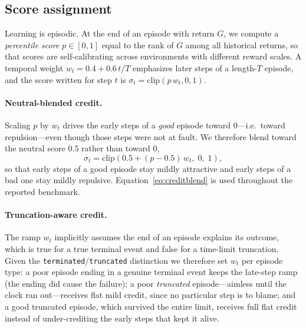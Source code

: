\documentclass[11pt]{article}
\begin{document}
\subsection{Score assignment}
Learning is episodic. At the end of an episode with return $G$, we compute a
\emph{percentile score} $p\in[0,1]$ equal to the rank of $G$ among all
historical returns, so that scores are self-calibrating across environments with
different reward scales. A temporal weight $w_t=0.4+0.6\,t/T$ emphasizes later
steps of a length-$T$ episode, and the score written for step $t$ is
$\sigma_t=\mathrm{clip}(p\,w_t,0,1)$.

\paragraph{Neutral-blended credit.} Scaling $p$ by $w_t$ drives the early steps
of a \emph{good} episode toward $0$---i.e.\ toward repulsion---even though those
steps were not at fault. We therefore blend toward the neutral score $0.5$
rather than toward $0$,
\begin{equation}
\sigma_t=\mathrm{clip}\!\left(0.5+(p-0.5)\,w_t,\;0,\;1\right),
\label{eq:creditblend}
\end{equation}
so that early steps of a good episode stay mildly attractive and early steps of
a bad one stay mildly repulsive. Equation~\eqref{eq:creditblend} is used
throughout the reported benchmark.

\paragraph{Truncation-aware credit.} The ramp $w_t$ implicitly assumes the end of
an episode explains its outcome, which is true for a true terminal event and
false for a time-limit truncation. Given the \texttt{terminated}/\texttt{truncated}
distinction we therefore set $w_t$ per episode type: a poor episode ending in a
genuine terminal event keeps the late-step ramp (the ending did cause the
failure); a poor \emph{truncated} episode---aimless until the clock ran
out---receives flat mild credit, since no particular step is to blame; and a good
truncated episode, which survived the entire limit, receives full flat credit
instead of under-crediting the early steps that kept it alive.
\end{document}
